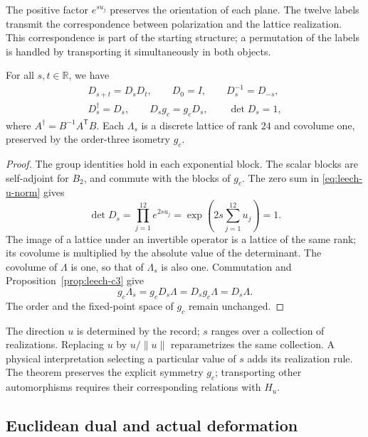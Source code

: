 The positive factor \(e^{su_j}\) preserves the orientation of each
plane. The twelve labels transmit the correspondence between
polarization and the lattice realization. This correspondence
is part of the starting structure; a permutation of the
labels is handled by transporting it simultaneously in both objects.

\begin{theorem}
\label{thm:leech-flow}
For all \(s,t\in\mathbb R\), we have
\[
\begin{gathered}
 D_{s+t}=D_sD_t,\qquad D_0=I,\qquad D_s^{-1}=D_{-s},\\
 D_s^\dagger=D_s,\qquad D_sg_c=g_cD_s,\qquad \det D_s=1,
\end{gathered}
\]
where \(A^\dagger=B^{-1}A^{\mathsf T}B\).
Each \(\Lambda_s\) is a discrete lattice of rank \(24\) and covolume
one, preserved by the order-three isometry \(g_c\).
\end{theorem}
\begin{proof}
The group identities hold in each exponential block.
The scalar blocks are self-adjoint for \(B_2\), and commute
with the blocks of \(g_c\). The zero sum in
\eqref{eq:leech-u-norm} gives
\[
 \det D_s=\prod_{j=1}^{12}e^{2su_j}
 =\exp\left(2s\sum_{j=1}^{12}u_j\right)=1.
\]
The image of a lattice under an invertible operator is a lattice of the
same rank; its covolume is multiplied by the absolute value of the
determinant. The covolume of \(\Lambda\) is one, so that
of \(\Lambda_s\) is also one. Commutation and
Proposition~\ref{prop:leech-c3} give
\[
 g_c\Lambda_s=g_cD_s\Lambda=D_sg_c\Lambda=D_s\Lambda.
\]
The order and the fixed-point space of \(g_c\) remain
unchanged.
\end{proof}

\begin{remark}
The direction \(u\) is determined by the record; \(s\) ranges over
a collection of realizations. Replacing \(u\) by \(u/\|u\|\)
reparametrizes the same collection. A physical interpretation
selecting a particular value of \(s\) adds its realization rule.
The theorem preserves the explicit symmetry \(g_c\); transporting
other automorphisms requires their corresponding relations with
\(H_u\).
\end{remark}

\subsection{Euclidean dual and actual deformation}
\label{subsec:leech-dual}

